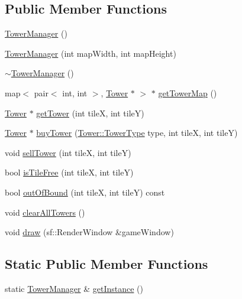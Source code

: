 \subsection*{Public Member Functions}
\begin{DoxyCompactItemize}
\item 
\hyperlink{class_tower_manager_ae42500401ee01f89fc2ac583f167af3b}{Tower\+Manager} ()
\item 
\hyperlink{class_tower_manager_ab8e7bf7431e7e9aeb105ee7f63841035}{Tower\+Manager} (int map\+Width, int map\+Height)
\item 
\hyperlink{class_tower_manager_aa2c2765238a8747803334c164e767e41}{$\sim$\+Tower\+Manager} ()
\item 
map$<$ pair$<$ int, int $>$, \hyperlink{class_tower}{Tower} $\ast$ $>$ $\ast$ \hyperlink{class_tower_manager_a3c54cdf57006efbcd9fc074f156d5360}{get\+Tower\+Map} ()
\item 
\hyperlink{class_tower}{Tower} $\ast$ \hyperlink{class_tower_manager_ae2cf2fc1dd19ced5d64ec74042673055}{get\+Tower} (int tile\+X, int tile\+Y)
\item 
\hyperlink{class_tower}{Tower} $\ast$ \hyperlink{class_tower_manager_ac057ea8072b060d0fad71fa218e219af}{buy\+Tower} (\hyperlink{class_tower_a110a21c18d4ec095c6234bd17f004b3e}{Tower\+::\+Tower\+Type} type, int tile\+X, int tile\+Y)
\item 
void \hyperlink{class_tower_manager_afa7bbe1d178269f32df231807ab419d8}{sell\+Tower} (int tile\+X, int tile\+Y)
\item 
bool \hyperlink{class_tower_manager_afd9c7b3113dd4d02b0ee875d705cdf39}{is\+Tile\+Free} (int tile\+X, int tile\+Y)
\item 
bool \hyperlink{class_tower_manager_a0158f9210b43ea166977e01768849c3a}{out\+Of\+Bound} (int tile\+X, int tile\+Y) const 
\item 
void \hyperlink{class_tower_manager_ae71fc7c55f92477846760b122d0f60b9}{clear\+All\+Towers} ()
\item 
void \hyperlink{class_tower_manager_aa795de46937cdcb51d7a885d79c069b3}{draw} (sf\+::\+Render\+Window \&game\+Window)
\end{DoxyCompactItemize}
\subsection*{Static Public Member Functions}
\begin{DoxyCompactItemize}
\item 
static \hyperlink{class_tower_manager}{Tower\+Manager} \& \hyperlink{class_tower_manager_ad23044e56ca84962064cfcb9bee3adaf}{get\+Instance} ()
\end{DoxyCompactItemize}
